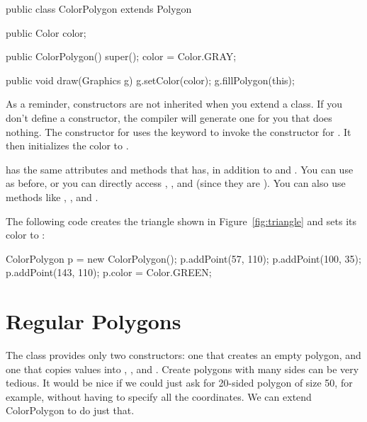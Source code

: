 \begin{code}
public class ColorPolygon extends Polygon {
    public Color color;

    public ColorPolygon() {
        super();
        color = Color.GRAY;
    }
    
    public void draw(Graphics g) {
        g.setColor(color);
        g.fillPolygon(this);
    }
}
\end{code}

As a reminder, constructors are not inherited when you extend a class.
If you don't define a constructor, the compiler will generate one for you that does nothing.
The constructor for  uses the  keyword to invoke the constructor for .
It then initializes the color to .

 has the same attributes and methods that  has, in addition to  and .
You can use  as before, or you can directly access , , and  (since they are ).
You can also use methods like , , and .

The following code creates the triangle shown in Figure~\ref{fig:triangle} and sets its color to :

\begin{code}
ColorPolygon p = new ColorPolygon();
p.addPoint(57, 110);
p.addPoint(100, 35);
p.addPoint(143, 110);
p.color = Color.GREEN;
\end{code}


\section{Regular Polygons}

The  class provides only two constructors: one that creates an empty polygon, and one that copies values into , , and .
Create polygons with many sides can be very tedious.
It would be nice if we could just ask for 20-sided polygon of size 50, for example, without having to specify all the coordinates.
We can extend ColorPolygon to do just that.
